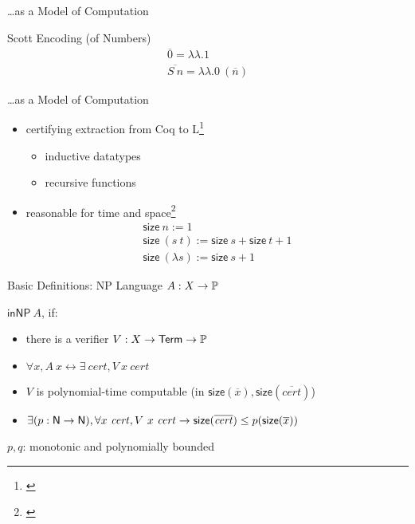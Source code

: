 \documentclass[11pt,usenames,dvipsnames,
  hyperref={pdfencoding=auto,psdextra}]{beamer}
\begin{document}
\begin{frame}{\ldots as a Model of Computation}
  \begin{block}{Scott Encoding (of Numbers)}
    \vspace{-1ex}
    \begin{align*} 
      \overline{0} = \lambda\lambda. 1\\
      \overline{S~n} = \lambda\lambda. 0~(\overline n)
    \end{align*}
    \vspace{-1ex}
  \end{block}
\end{frame}
\begin{frame}[noframenumbering]{\ldots as a Model of Computation}

  \begin{itemize}
    \item certifying extraction from Coq to L\footnote{\cite{ForsterKunze:2019:Certifying-extraction}}
      \begin{itemize}
        \item inductive datatypes
        \item recursive functions
      \end{itemize}
    \item<2-> reasonable for time and space\footnote{\cite{ForsterKunzeRoth:2019:wcbv-Reasonable}}
      \begin{gather*}
        \textsf{size}~n := 1 \\
        \textsf{size}~(s~t) := \textsf{size}~s + \textsf{size}~t + 1 \\ 
        \textsf{size}~(\lambda s) := \textsf{size}~s + 1
      \end{gather*}
  \end{itemize}

\end{frame}

\begin{frame}{Basic Definitions: NP}
  Language $A : X \rightarrow \mathbb{P}$

  \vspace{2ex}
  $\textsf{inNP}~A$, if:
  \begin{itemize}
    \item there is a verifier $V : X \rightarrow \textsf{Term} \rightarrow \mathbb{P}$
    \item $\forall x, A~x \leftrightarrow \exists~\mathit{cert}, V~x~\mathit{cert}$
    \item $V$ is polynomial-time computable (in $\textsf{size}(\overline x), \textsf{size}(\overline{cert})$)
    \item $\exists (p : \mathsf{N} \rightarrow \mathsf{N}), \forall x~\mathit{cert}, V~x~\mathit{cert} \rightarrow \textsf{size}(\overline {\mathit{cert}}) \le p(\textsf{size}(\overline x))$
  \end{itemize}
  \vspace{2ex}
  $p,q$: monotonic and polynomially bounded
\end{frame}
\end{document}
